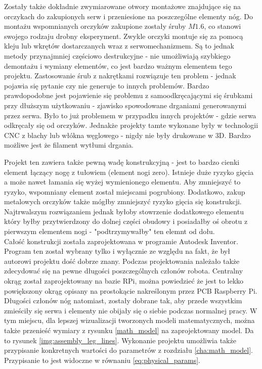 Zostały także dokładnie zwymiarowane otwory montażowe znajdujące się na orczykach do zakupionych serw i przeniesione na poszczególne elementy nóg. Do montażu wspomnianych orczyków zakupione zostały śruby $M1.6$, co stanowi swojego rodzaju drobny eksperyment. Zwykle orczyki montuje się za pomocą kleju lub wkrętów dostarczanych wraz z serwomechanizmem. Są to jednak metody przynajmniej częściowo destrukcyjne - nie umożliwiają szybkiego demontażu i wymiany elementów, co jest bardzo ważnym elementem tego projektu. Zastosowanie śrub z nakrętkami rozwiązuje ten problem - jednak pojawia się pytanie czy nie generuje to innych problemów. Bardzo prawdopodobne jest pojawienie się problemu z samoodkręcającymi się śrubkami przy dłuższym użytkowaniu - zjawisko spowodowane drganiami generowanymi przez serwa. Było to już problemem w przypadku innych projektów - gdzie serwa odkręcały się od orczyków. Jednakże projekty tamte wykonane były w technologii CNC z blachy lub włókna węglowego - nigdy nie były drukowane w 3D. Bardzo możliwe jest że filament wytłumi drgania.

Projekt ten zawiera także pewną wadę konstrukcyjną - jest to bardzo cienki element łączący nogę z tułowiem (element nogi zero). Istnieje duże ryzyko gięcia a może nawet łamania się wyżej wymienionego elementu. Aby zmniejszyć to ryzyko, wspomniany element został miejscami pogrubiony. Dodatkowo, zakup metalowych orczyków także mógłby zmniejszyć ryzyko gięcia się konstrukcji. Najtrwalszym rozwiązaniem jednak byłoby stowrzenie dodatkowego elementu który byłby przytwierdzony do dolnej części obudowy i posiadałby oś obrotu z pierwszym elementem nogi -  "podtrzymywałby" ten elemnt od dołu.\\

Całość konstrukcji została zaprojektowana w programie Autodesk Inventor. Program ten został wybrany tylko i wyłącznie ze względu na fakt, że był autorowi projektu dość dobrze znany. Podczas projektowania należało także zdecydować się na pewne długości poszczególnych członów robota. Centralny okrąg został zaprojektowany na bazie RPi, można powiedzieć że jest to lekko powiększony okrąg opisany na prostokącie nakreślonym przez PCB Raspberry Pi. Długości członów nóg natomiast, zostały dobrane tak, aby przede wszystkim zmieściły się serwa i elementy nie obijały się o siebie podczas normalnej pracy. W tym miejscu, dla lepszej wizualizacji tworzonych modeli matematycznych, można także przenieść wymiary z rysunku \ref{math_model} na zaprojektowany model. Da to rysunek \ref{img:assembly_leg_lines}. Wykonanie projektu umożliwia także przypisanie konkretnych wartości do parametrów z rozdziału \ref{cha:math_model}. Przypisanie to jest widoczne w równaniu \ref{eq:physical_params}.

